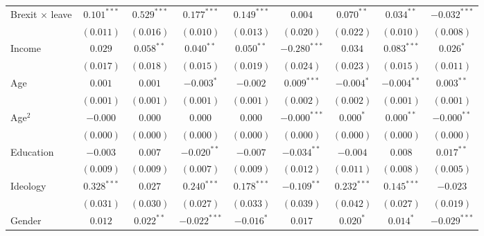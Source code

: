 \documentclass[12pt, letter]{article}
\begin{document}
\begin{table}
\begin{center}
{\begin{tabular}{l c c c c c c c c }
Brexit $\times$ leave            & $0.101^{***}$  & $0.529^{***}$  & $0.177^{***}$  & $0.149^{***}$  & $0.004$        & $0.070^{**}$   & $0.034^{**}$   & $-0.032^{***}$ \\
                                 & $(0.011)$      & $(0.016)$      & $(0.010)$      & $(0.013)$      & $(0.020)$      & $(0.022)$      & $(0.010)$      & $(0.008)$      \\
Income                           & $0.029$        & $0.058^{**}$   & $0.040^{**}$   & $0.050^{**}$   & $-0.280^{***}$ & $0.034$        & $0.083^{***}$  & $0.026^{*}$    \\
                                 & $(0.017)$      & $(0.018)$      & $(0.015)$      & $(0.019)$      & $(0.024)$      & $(0.023)$      & $(0.015)$      & $(0.011)$      \\
Age                              & $0.001$        & $0.001$        & $-0.003^{*}$   & $-0.002$       & $0.009^{***}$  & $-0.004^{*}$   & $-0.004^{**}$  & $0.003^{**}$   \\
                                 & $(0.001)$      & $(0.001)$      & $(0.001)$      & $(0.001)$      & $(0.002)$      & $(0.002)$      & $(0.001)$      & $(0.001)$      \\
Age$^2$                          & $-0.000$       & $0.000$        & $0.000$        & $0.000$        & $-0.000^{***}$ & $0.000^{*}$    & $0.000^{**}$   & $-0.000^{**}$  \\
                                 & $(0.000)$      & $(0.000)$      & $(0.000)$      & $(0.000)$      & $(0.000)$      & $(0.000)$      & $(0.000)$      & $(0.000)$      \\
Education                        & $-0.003$       & $0.007$        & $-0.020^{**}$  & $-0.007$       & $-0.034^{**}$  & $-0.004$       & $0.008$        & $0.017^{**}$   \\
                                 & $(0.009)$      & $(0.009)$      & $(0.007)$      & $(0.009)$      & $(0.012)$      & $(0.011)$      & $(0.008)$      & $(0.005)$      \\
Ideology                         & $0.328^{***}$  & $0.027$        & $0.240^{***}$  & $0.178^{***}$  & $-0.109^{**}$  & $0.232^{***}$  & $0.145^{***}$  & $-0.023$       \\
                                 & $(0.031)$      & $(0.030)$      & $(0.027)$      & $(0.033)$      & $(0.039)$      & $(0.042)$      & $(0.027)$      & $(0.019)$      \\
Gender                           & $0.012$        & $0.022^{**}$   & $-0.022^{***}$ & $-0.016^{*}$   & $0.017$        & $0.020^{*}$    & $0.014^{*}$    & $-0.029^{***}$ \\

\end{tabular}}
\end{center}
\end{table}
\end{document}
